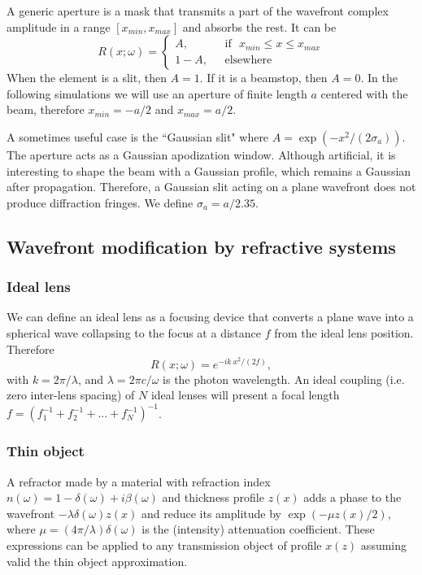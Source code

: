 \documentclass{iucr}              %
\begin{document}
A generic aperture is a mask that transmits a part of the wavefront complex amplitude in a range $[x_{min},x_{max}]$ and absorbs the rest. It can be
\begin{equation}
R(x;\omega) =
\left\{
\begin{matrix}
A,  & \mbox{~~if~~} x_{min} \le x \le x_{max}
\\ 
1 - A, & \mbox{~~elsewhere}
\end{matrix}
\right.
\end{equation}
When the element is a slit, then $A=1$. If it is a beamstop, then $A=0$. In the following simulations we will use an aperture of finite length $a$ centered with the beam, therefore $x_{min}=-a/2$ and $x_{max}=a/2$.

A sometimes useful case is the ``Gaussian slit" where $A=\exp(-x^2/(2\sigma_a))$. The aperture acts as a Gaussian apodization window. Although artificial, it is interesting to shape the beam with a Gaussian profile, which remains a Gaussian after propagation. Therefore, a Gaussian slit acting on a plane wavefront does not produce diffraction fringes.
We define $\sigma_a=a/2.35$.

\subsection{Wavefront modification by refractive systems}

\subsubsection{Ideal lens}
We can define an ideal lens as a focusing device that converts a plane wave into a spherical wave collapsing to the focus at a distance $f$ from the ideal lens position. Therefore
\begin{equation}
    R(x;\omega) = e^{-i k~x^2/(2 f)},
\end{equation}
with $k=2\pi/\lambda$, and $\lambda=2\pi c/\omega$ is the photon wavelength. 
An ideal coupling (i.e. zero inter-lens spacing) of $N$ ideal lenses will present a focal length $f=(f_1^{-1}+f_2^{-1}+...+f_N^{-1})^{-1}$. 

\subsubsection{Thin object} A refractor made by a material with refraction index $n(\omega)=1-\delta(\omega)+i\beta(\omega)$ 
and thickness profile $z(x)$ adds a phase to the wavefront $-\lambda \delta(\omega) z(x)$ and reduce its amplitude by $\exp(-\mu z(x)/2)$, where $\mu=(4 \pi/\lambda) \delta(\omega)$ is the (intensity) attenuation coefficient. These expressions can be applied to any transmission object of profile $x(z)$ assuming valid the thin object approximation. 
\end{document}
